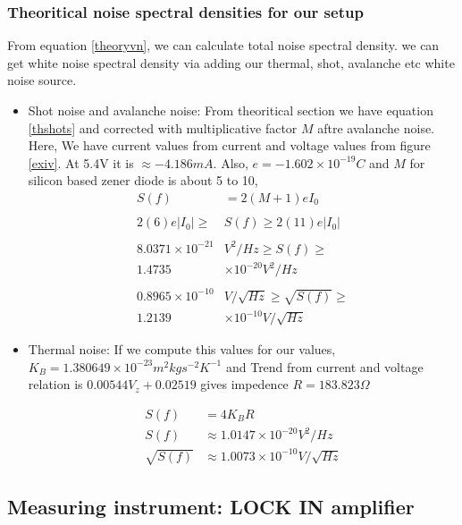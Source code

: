 \subsubsection{Theoritical noise spectral densities for our setup}

From equation \ref{theoryvn}, we can calculate total noise spectral density. we can get white noise spectral density via adding our thermal, shot, avalanche etc white noise source. 


\begin{itemize}

\item Shot noise and avalanche noise: From theoritical section we have equation \ref{thshots} and corrected with multiplicative factor $M$ aftre avalanche noise. Here, We have current values from current and voltage values from figure \ref{exiv}. At 5.4V it is $\approx -4.186 mA$. Also, $e = -1.602 \times 10^{-19} C$ and $M$ for silicon based zener diode is about 5 to 10,
\begin{align*}
  S(f) & = 2 (M+1) e I_0\\
  \\
  2(6)e|I_0| \geq & S(f) \geq 2(11)e|I_0|\\
  \\
  8.0371 \times 10^{-21} & V^2/Hz \geq  S(f) \geq \\
  1.4735 & \times 10^{-20} V^2/Hz\\
  \\
  0.8965 \times 10^{-10} &  V/\sqrt{Hz} \geq \sqrt{S(f)} \geq \\
  1.2139 & \times 10^{-10} V/\sqrt{Hz}
\end{align*}

\item Thermal noise: If we compute this values for our values, $K_B = 1.380649 × 10^{-23} m^2 kg s^{-2} K^{-1}$ and Trend from current and voltage relation is $0.00544V_z+0.02519$ gives impedence $R= 183.823 \Omega$

\begin{align}\label{thths}
  S(f) & = 4 K_B R\\
  S(f) & \approx 1.0147 \times 10^{-20} V^2/Hz \\
  \sqrt{S(f)} & \approx 1.0073 \times 10^{-10} V/\sqrt{Hz}
\end{align}


\end{itemize}



\subsection{Measuring instrument: LOCK IN amplifier}

